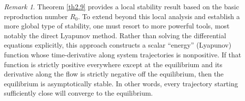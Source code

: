 \documentclass[10pt, a4paper]{amsart}
\theoremstyle{plain}
\theoremstyle{definition}
\theoremstyle{remark}
\newtheorem{remark}[lemma]{Remark}
\numberwithin{equation}{section}
\begin{document}







\begin{remark}
Theorem \ref{th2.9} provides a local stability result based on the basic reproduction number $R_0$. To extend beyond this local analysis and establish a more global type of stability, one must resort to more powerful tools, most notably the direct Lyapunov method. Rather than solving the differential equations explicitly, this approach constructs a scalar “energy” (Lyapunov) function whose time‑derivative along system trajectories is nonpositive. If that function is strictly positive everywhere except at the equilibrium and its derivative along the flow is strictly negative off the equilibrium, then the equilibrium is asymptotically stable. In other words, every trajectory starting sufficiently close will converge to the equilibrium.
\end{remark}
\end{document}
